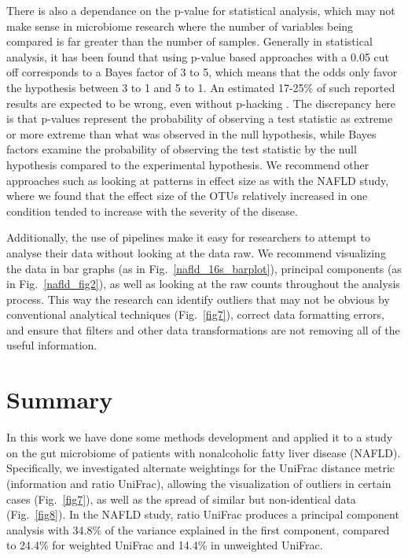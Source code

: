 There is also a dependance on the p-value for statistical analysis, which may not make sense in microbiome research where the number of variables being compared is far greater than the number of samples. Generally in statistical analysis, it has been found that using p-value based approaches with a 0.05 cut off corresponds to a Bayes factor of 3 to 5, which means that the odds only favor the hypothesis between 3 to 1 and 5 to 1. An estimated 17-25\% of such reported results are expected to be wrong, even without p-hacking \cite{johnson2013revised}. The discrepancy here is that p-values represent the probability of observing a test statistic as extreme or more extreme than what was observed in the null hypothesis, while Bayes factors examine the probability of observing the test statistic by the null hypothesis compared to the experimental hypothesis. We recommend other approaches such as looking at patterns in effect size as with the NAFLD study, where we found that the effect size of the OTUs relatively increased in one condition tended to increase with the severity of the disease.

Additionally, the use of pipelines make it easy for researchers to attempt to analyse their data without looking at the data raw. We recommend visualizing the data in bar graphs (as in Fig.~\ref{nafld_16s_barplot}), principal components (as in Fig.~\ref{nafld_fig2}), as well as looking at the raw counts throughout the analysis process. This way the research can identify outliers that may not be obvious by conventional analytical techniques (Fig.~\ref{fig7}), correct data formatting errors, and ensure that filters and other data transformations are not removing all of the useful information.

\section{Summary}

In this work we have done some methods development and applied it to a study on the gut microbiome of patients with nonalcoholic fatty liver disease (NAFLD). Specifically, we investigated alternate weightings for the UniFrac distance metric (information and ratio UniFrac), allowing the visualization of outliers in certain cases (Fig.~\ref{fig7}), as well as the spread of similar but non-identical data (Fig.~\ref{fig8}). In the NAFLD study, ratio UniFrac produces a principal component analysis with 34.8\% of the variance explained in the first component, compared to 24.4\% for weighted UniFrac and 14.4\% in unweighted UniFrac.

